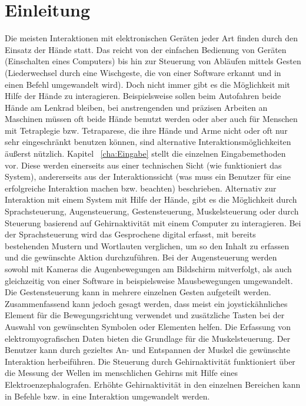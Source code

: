 \chapter{Einleitung}
\label{cha:Einleitung}

Die meisten Interaktionen mit elektronischen Geräten jeder Art finden durch den Einsatz der Hände statt. Das reicht von der einfachen Bedienung von Geräten (\zB Einschalten eines Computers) bis hin zur Steuerung von Abläufen mittels Gesten (\zB Liederwechsel durch eine Wischgeste, die von einer Software erkannt und in einen Befehl umgewandelt wird). Doch nicht immer gibt es die Möglichkeit mit Hilfe der Hände zu interagieren. Beispielsweise sollen beim Autofahren beide Hände am Lenkrad bleiben, bei anstrengenden und präzisen Arbeiten an Maschinen müssen oft beide Hände benutzt werden oder aber auch für Menschen mit Tetraplegie bzw. Tetraparese, die ihre Hände und Arme nicht oder oft nur sehr eingeschränkt benutzen können, sind alternative Interaktionsmöglichkeiten äußerst nützlich.
\newline \newline
Kapitel ~\ref{cha:Eingabe} stellt die einzelnen Eingabemethoden vor. Diese werden einerseits aus einer technischen Sicht (wie funktioniert das System), andererseits aus der Interaktionssicht (was muss ein Benutzer für eine erfolgreiche Interaktion machen bzw. beachten) beschrieben. Alternativ zur Interaktion mit einem System mit Hilfe der Hände, gibt es die Möglichkeit durch Sprachsteuerung, Augensteuerung, Gestensteuerung, Muskelsteuerung oder durch Steuerung basierend auf Gehirnaktivität mit einem Computer zu interagieren. Bei der Sprachsteuerung wird das Gesprochene digital erfasst, mit bereits bestehenden Mustern und Wortlauten verglichen, um so den Inhalt zu erfassen und die gewünschte Aktion durchzuführen. Bei der Augensteuerung werden sowohl mit Kameras die Augenbewegungen am Bildschirm mitverfolgt, als auch gleichzeitig von einer Software in beispielsweise Mausbewegungen umgewandelt. Die Gestensteuerung kann in mehrere einzelnen Gesten aufgeteilt werden. Zusammenfassend kann jedoch gesagt werden, dass meist ein joystickähnliches Element für die Bewegungsrichtung verwendet und zusätzliche Tasten bei der Auswahl von gewünschten Symbolen oder Elementen helfen. Die Erfassung von elektromyografischen Daten bieten die Grundlage für die Muskelsteuerung. Der Benutzer kann durch gezieltes An- und Entspannen der Muskel die gewünschte Interaktion herbeiführen. Die Steuerung durch Gehirnaktivität funktioniert über die Messung der Wellen im menschlichen Gehirns mit Hilfe eines  Elektroenzephalografen. Erhöhte Gehirnaktivität in den einzelnen Bereichen kann in Befehle bzw. in eine Interaktion umgewandelt werden.
